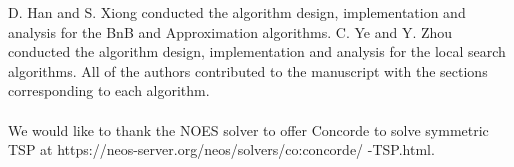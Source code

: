 \begin{acks}
D. Han and S. Xiong conducted the algorithm design, implementation and analysis for the BnB and Approximation algorithms. C. Ye and Y. Zhou conducted the algorithm design, implementation and analysis for the local search algorithms. All of the authors contributed to the manuscript with the  sections corresponding to each algorithm. \\
\hfill\\
We would like to thank the NOES solver to offer Concorde to solve symmetric TSP at https://neos-server.org/neos/solvers/co:concorde/ -TSP.html.

\end{acks}
